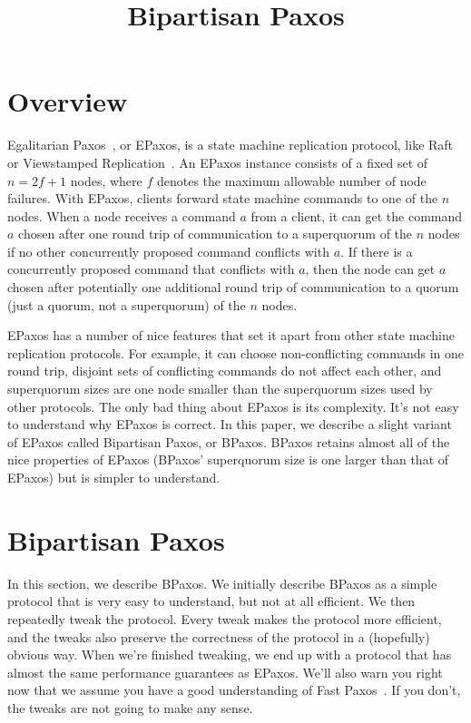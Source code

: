 \documentclass{mwhittaker}
\title{Bipartisan Paxos}
\begin{document}
\maketitle

\section{Overview}
Egalitarian Paxos~\cite{moraru2013there}, or EPaxos, is a state machine
replication protocol, like Raft~\cite{ongaro2014search} or Viewstamped
Replication~\cite{liskov2012viewstamped}. An EPaxos instance consists of a
fixed set of $n = 2f + 1$ nodes, where $f$ denotes the maximum allowable number
of node failures. With EPaxos, clients forward state machine commands to one of
the $n$ nodes. When a node receives a command $a$ from a client, it can get the
command $a$ chosen after one round trip of communication to a superquorum of
the $n$ nodes if no other concurrently proposed command conflicts with $a$. If
there is a concurrently proposed command that conflicts with $a$, then the node
can get $a$ chosen after potentially one additional round trip of communication
to a quorum (just a quorum, not a superquorum) of the $n$ nodes.

EPaxos has a number of nice features that set it apart from other state machine
replication protocols. For example, it can choose non-conflicting commands in
one round trip, disjoint sets of conflicting commands do not affect each other,
and superquorum sizes are one node smaller than the superquorum sizes used by
other protocols. The only bad thing about EPaxos is its complexity. It's not
easy to understand why EPaxos is correct.
%
In this paper, we describe a slight variant of EPaxos called Bipartisan Paxos,
or BPaxos. BPaxos retains almost all of the nice properties of EPaxos (BPaxos'
superquorum size is one larger than that of EPaxos) but is simpler to
understand.

\section{Bipartisan Paxos}
In this section, we describe BPaxos. We initially describe BPaxos as a simple
protocol that is very easy to understand, but not at all efficient. We then
repeatedly tweak the protocol. Every tweak makes the protocol more efficient,
and the tweaks also preserve the correctness of the protocol in a (hopefully)
obvious way. When we're finished tweaking, we end up with a protocol that has
almost the same performance guarantees as EPaxos.
%
We'll also warn you right now that we assume you have a good understanding of
Fast Paxos~\cite{lamport2006fast}. If you don't, the tweaks are not going to
make any sense.
\end{document}
